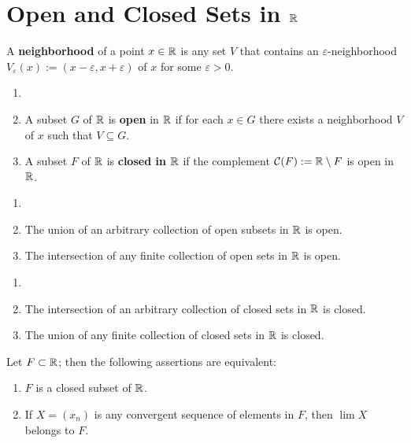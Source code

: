 \section{Open and Closed Sets in $\mathbb{R}$}

\begin{definition}
	A \textbf{neighborhood} of a point $x \in \mathbb{R}$ is any set $V$ that contains an $\varepsilon$-neighborhood $V_\varepsilon(x):=(x-\varepsilon,x+\varepsilon)$ of $x$ for some $\varepsilon>0$.
\end{definition}

\begin{definition}
	\begin{enumerate}
		\item[]
		\item A subset $G$ of $\mathbb{R}$ is \textbf{open} in $\mathbb{R}$ if for each $x \in G$ there exists a neighborhood $V$ of $x$ such that $V \subseteq G$.
		\item A subset $F$ of $\mathbb{R}$ is \textbf{closed in $\mathbb{R}$} if the complement $\mathcal{C}(F):=\mathbb{R}\setminus F$ is open in $\mathbb{R}$.
	\end{enumerate}
\end{definition}

\begin{theorem}
	\begin{enumerate}
		\item[]
		\item The union of an arbitrary collection of open subsets in $\mathbb{R}$ is open.
		\item The intersection of any finite collection of open sets in $\mathbb{R}$ is open.
	\end{enumerate}
\end{theorem}

\begin{theorem}
	\begin{enumerate}
		\item[]
		\item The intersection of an arbitrary collection of closed sets in $\mathbb{R}$ is closed.
		\item The union of any finite collection of closed sets in $\mathbb{R}$ is closed.
	\end{enumerate}
\end{theorem}

\begin{theorem}
	Let $F \subset \mathbb{R}$; then the following assertions are equivalent:
	\begin{enumerate}
		\item $F$ is a closed subset of $\mathbb{R}$.
		\item If $X=(x_n)$ is any convergent sequence of elements in $F$, then $\lim X$ belongs to $F$.
	\end{enumerate}
\end{theorem}

